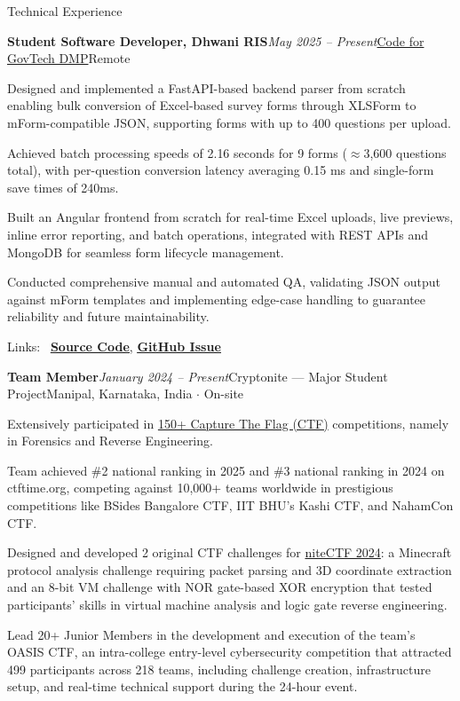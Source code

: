 \documentclass{resume} %
\begin{document}
\begin{rSection}{Technical Experience}

\begin{rSubsection}{\bf Student Software Developer, Dhwani RIS}{\em May 2025 -- Present}{\href{https://codeforgovtech.in/dedicated_mentoring_program/}{Code for GovTech DMP}}{Remote}
\item Designed and implemented a FastAPI-based backend parser from scratch enabling bulk conversion of Excel-based survey forms through XLSForm to mForm-compatible JSON, supporting forms with up to 400 questions per upload.
\item Achieved batch processing speeds of 2.16 seconds for 9 forms ($\approx$3,600 questions total), with per-question conversion latency averaging 0.15 ms and single-form save times of 240ms.
\item Built an Angular frontend from scratch for real-time Excel uploads, live previews, inline error reporting, and batch operations, integrated with REST APIs and MongoDB for seamless form lifecycle management.
\item Conducted comprehensive manual and automated QA, validating JSON output against mForm templates and implementing edge-case handling to guarantee reliability and future maintainability.
\item Links: \faGithub~\href{https://github.com/vee1e/bulk-questionnaire-upload}{\textbf{\underline{Source Code}}}, \href{https://github.com/dhwani-ris/bulk-questionnaire-upload/issues/1}{\textbf{\underline{GitHub Issue}}}
\end{rSubsection}

\begin{rSubsection}{\bf Team Member}{\em January 2024 -- Present}{Cryptonite --- Major Student Project}{Manipal, Karnataka, India $\cdot$ On-site}
\item Extensively participated in \href{https://ctftime.org/team/62713/}{150+ Capture The Flag (CTF)} competitions, namely in Forensics and Reverse Engineering.
\item Team achieved \#2 national ranking in 2025 and \#3 national ranking in 2024 on ctftime.org, competing against 10,000+ teams worldwide in prestigious competitions like BSides Bangalore CTF, IIT BHU's Kashi CTF, and NahamCon CTF.
\item Designed and developed 2 original CTF challenges for \href{https://github.com/Cryptonite-MIT/niteCTF-2024/}{niteCTF 2024}: a Minecraft protocol analysis challenge requiring packet parsing and 3D coordinate extraction and an 8-bit VM challenge with NOR gate-based XOR encryption that tested participants' skills in virtual machine analysis and logic gate reverse engineering.
\item Lead 20+ Junior Members in the development and execution of the team's OASIS CTF, an intra-college entry-level cybersecurity competition that attracted 499 participants across 218 teams, including challenge creation, infrastructure setup, and real-time technical support during the 24-hour event.
\end{rSubsection}


\end{rSection}
\end{document}
